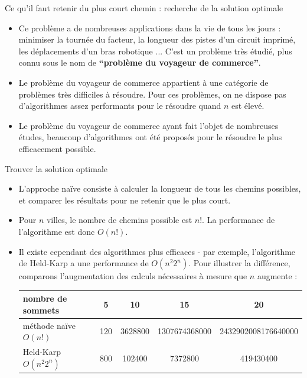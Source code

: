 \begin{frame}{Ce qu'il faut retenir du plus court chemin : recherche de la solution optimale}
  
  \begin{itemize}
    \item Ce problème a de nombreuses applications dans la vie de tous les jours : minimiser la tournée du facteur, la longueur des pistes d'un circuit imprimé, les déplacements d'un bras robotique ... C'est un problème très étudié, plus connu sous le nom de \textbf{``problème du voyageur de commerce''}.
    \item Le problème du voyageur de commerce appartient à une catégorie de problèmes très difficiles à résoudre. Pour ces problèmes, on ne dispose pas d'algorithmes assez performants pour le résoudre quand $n$ est élevé. 
    \item Le problème du voyageur de commerce ayant fait l'objet de nombreuses études, beaucoup d'algorithmes ont été proposés pour le résoudre le plus efficacement possible.
  \end{itemize}

  \begin{block}{Trouver la solution optimale}
    
    \begin{itemize}
      \item L'approche naïve consiste à calculer la longueur de tous les chemins possibles, et comparer les résultats pour ne retenir que le plus court. 
      \item Pour $n$ villes, le nombre de chemins possible est $n!$. La performance de l'algorithme est donc $O(n!)$.
      \item Il existe cependant des algorithmes plus efficaces - par exemple, l'algorithme de Held-Karp a une performance de $O(n^{2}2^n)$. Pour illustrer la différence, comparons l'augmentation des calculs nécessaires à mesure que $n$ augmente :

      \bigskip

      \begin{center}
        \begin{tabular}{|l|cccc|}
          \hline
          nombre de sommets       & 5   & 10      & 15            & 20 \\
          \hline
          méthode naïve $O(n!)$   & 120 & 3628800 & 1307674368000 & 2432902008176640000 \\
          Held-Karp $O(n^{2}2^n)$ & 800 & 102400  & 7372800       & 419430400 \\
          \hline
        \end{tabular} 
      \end{center}


\end{itemize}
\end{block}
\end{frame}
